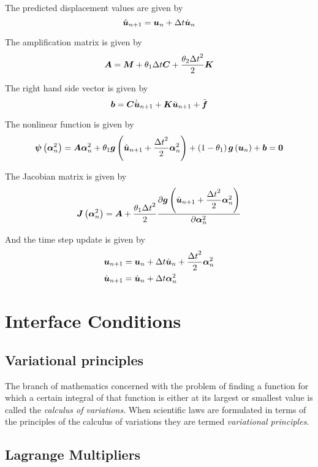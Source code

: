 The predicted displacement values are given by
\begin{equation}
   \hat{\boldsymbol{u}}_{n+1} = \boldsymbol{u}_{n}+\Delta t\dot{\boldsymbol{u}}_{n}
\end{equation}

The amplification matrix is given by
\begin{equation}
  \matr{A}=\matr{M}+\theta_{1}\Delta t\matr{C}+\dfrac{\theta_{2}{\Delta t}^{2}}{2}\matr{K}
\end{equation}

The right hand side vector is given by
\begin{equation}
  \vectr{b}=\matr{C}\dot{\bar{\vectr{u}}}_{n+1}+\matr{K}\bar{\vectr{u}}_{n+1}+\bar{\vectr{f}}
\end{equation}

The nonlinear function is given by
\begin{equation}
  \fnof{\vectr{\psi}}{\vectr{\alpha}^{2}_{n}}=\matr{A}\vectr{\alpha}^{2}_{n}+\theta_{1}\fnof{\vectr{g}}{\hat{\vectr{u}}_{n+1}+ 
    \dfrac{{\Delta t}^{2}}{2}\vectr{\alpha}^{2}_{n}}+\pbrac{1-\theta_{1}}\fnof{\vectr{g}}{\vectr{u}_{n}}+\vectr{b}=\vectr{0}
\end{equation}

The Jacobian matrix is given by
\begin{equation}
  \fnof{\matr{J}}{\vectr{\alpha}^{2}_{n}}=\matr{A}+\dfrac{\theta_{1}{\Delta t}^{2}}{2}
  \delby{\fnof{\vectr{g}}{{\hat{\vectr{u}}_{n+1}+\dfrac{{\Delta t}^{2}}{2}\vectr{\alpha}^{2}_{n}}}}{\vectr{\alpha}^{2}_{n}}
\end{equation}

And the time step update is given by
\begin{equation}
  \begin{split}
    \boldsymbol{u}_{n+1} &= \boldsymbol{u}_{n}+\Delta t\dot{\boldsymbol{u}}_{n} +\dfrac{{\Delta t}^{2}}{2}\boldsymbol{\alpha}^{2}_{n} \\
    \dot{\boldsymbol{u}}_{n+1} &= \dot{\boldsymbol{u}}_{n}+\Delta t\boldsymbol{\alpha}^{2}_{n} 
  \end{split}
\end{equation}

\section{Interface Conditions}

\subsection{Variational principles}

The branch of mathematics concerned with the problem of finding a function for
which a certain integral of that function is either at its largest or smallest
value is called the \emph{calculus of variations}. When scientific laws are formulated in terms of the principles of the calculus
of variations they are termed \emph{variational principles}. 

\subsection{Lagrange Multipliers}

